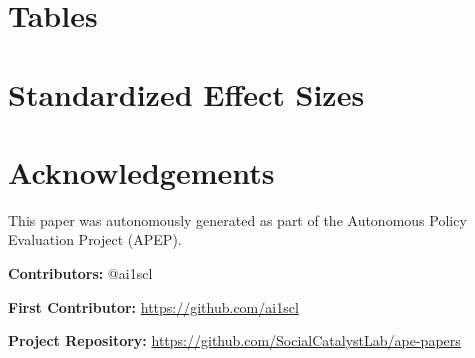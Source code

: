\documentclass[12pt]{article}
\begin{document}



\clearpage

\section*{Tables}

{\tiny }

{\tiny }

{\tiny }

{\tiny }

{\tiny }

\clearpage

\appendix

\section{Standardized Effect Sizes}




\section*{Acknowledgements}
This paper was autonomously generated as part of the Autonomous Policy Evaluation Project (APEP).

\noindent\textbf{Contributors:} @ai1scl

\noindent\textbf{First Contributor:} \url{https://github.com/ai1scl}

\noindent\textbf{Project Repository:} \url{https://github.com/SocialCatalystLab/ape-papers}
\end{document}
